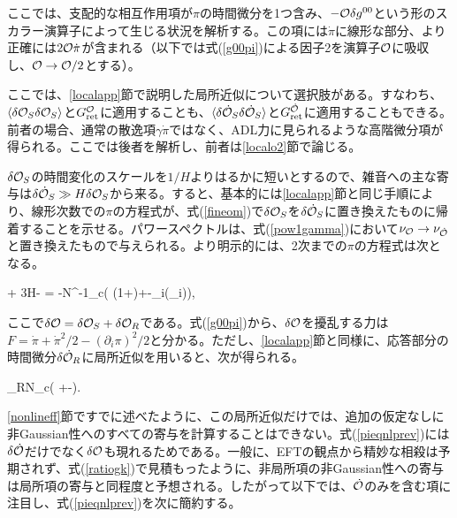 \label{Nolocalo2}

ここでは、支配的な相互作用項が$\pi$の時間微分を1つ含み、$-{\cal O}\delta g^{00}$という形のスカラー演算子によって生じる状況を解析する。この項には$\dot\pi$に線形な部分、より正確には$2{\cal O}\dot\pi$が含まれる（以下では式(\ref{g00pi})による因子2を演算子${\cal O}$に吸収し、${\cal O}\to{\cal O}/2$とする）。

ここでは、\ref{localapp}節で説明した局所近似について選択肢がある。すなわち、$\langle\delta{\cal O}_S\delta{\cal O}_S\rangle$と$G^{{\cal O}}_{\rm ret}$に適用することも、$\langle\delta\dot{{\cal O}}_S\delta\dot{{\cal O}}_S\rangle$と$G^{\dot{{\cal O}}}_{\rm ret}$に適用することもできる。前者の場合、通常の散逸項$\gamma\dot\pi$ではなく、ADL力に見られるような高階微分項が得られる。ここでは後者を解析し、前者は\ref{localo2}節で論じる。

$\delta{\cal O}_S$の時間変化のスケールを$1/H$よりはるかに短いとするので、雑音への主な寄与は$\delta\dot{{\cal O}}_S\gg H\delta{\cal O}_S$から来る。すると、基本的には\ref{localapp}節と同じ手順により、線形次数での$\pi$の方程式が、式(\ref{fineom})で$\delta{\cal O}_S$を$\delta\dot{{\cal O}}_S$に置き換えたものに帰着することを示せる。パワースペクトルは、式(\ref{pow1gamma})において$\nu_{{\cal O}}\to\nu_{\dot{{\cal O}}}$と置き換えたもので与えられる。より明示的には、2次までの$\pi$の方程式は次となる。

\beq
\ddot\pi + 3H\dot\pi  - \pi = -N^{-1}_c\left(\delta\dot{\calo} (1+\dot{\pi})+\delta\calo\ddot\pi -\partial_i(\delta\calo\partial_i\pi)\right),\label{pieqnlprev}
\eeq

ここで$\delta{\cal O}=\delta{\cal O}_S+\delta{\cal O}_R$である。式(\ref{g00pi})から、$\delta{\cal O}$を擾乱する力は$F=\dot\pi+\dot\pi^2/2-(\partial_i\pi)^2/2$と分かる。ただし、\ref{localapp}節と同様に、応答部分の時間微分$\delta\dot{{\cal O}}_R$に局所近似を用いると、次が得られる。

\beq
\label{ocaldot}
\delta\dot\calo_R\simeq N_c\gamma\left(\dot{\pi} +-\right).
\eeq

\ref{nonlineff}節ですでに述べたように、この局所近似だけでは、追加の仮定なしに非Gaussian性へのすべての寄与を計算することはできない。式(\ref{pieqnlprev})には$\delta\dot{{\cal O}}$だけでなく$\delta{\cal O}$も現れるためである。一般に、EFTの観点から精妙な相殺は予期されず、式(\ref{ratiogk})で見積もったように、非局所項の非Gaussian性への寄与は局所項の寄与と同程度と予想される。したがって以下では、$\dot{{\cal O}}$のみを含む項に注目し、式(\ref{pieqnlprev})を次に簡約する。

